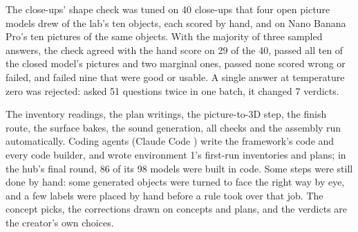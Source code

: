 \endgroup

The close-ups' shape check was tuned on 40 close-ups that four open picture models drew of the lab's ten objects, each scored by hand, and on Nano Banana Pro's ten pictures of the same objects. With the majority of three sampled answers, the check agreed with the hand score on 29 of the 40, passed all ten of the closed model's pictures and two marginal ones, passed none scored wrong or failed, and failed nine that were good or usable. A single answer at temperature zero was rejected: asked 51 questions twice in one batch, it changed 7 verdicts.

The inventory readings, the plan writings, the picture-to-3D step, the finish route, the surface bakes, the sound generation, all checks and the assembly run automatically. Coding agents (Claude Code \citep{claudecode}) write the framework's code and every code builder, and wrote environment 1's first-run inventories and plans; in the hub's final round, 86 of its 98 models were built in code. Some steps were still done by hand: some generated objects were turned to face the right way by eye, and a few labels were placed by hand before a rule took over that job. The concept picks, the corrections drawn on concepts and plans, and the verdicts are the creator's own choices.
